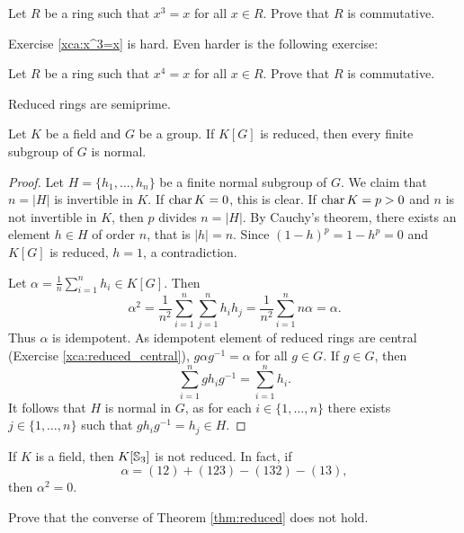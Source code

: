 \begin{exercise}
\label{xca:x^3=x}
    Let $R$ be a ring such that $x^3=x$ for all $x\in R$. Prove that
    $R$ is commutative. 
\end{exercise}

Exercise \ref{xca:x^3=x} is hard. 
Even harder is the following exercise:

\begin{exercise}
\label{xca:x^4=x}
    Let $R$ be a ring such that $x^4=x$ for all $x\in R$. Prove
    that $R$ is commutative. 
\end{exercise}



\begin{exercise}
\label{xca:reduced=>semiprime}
    Reduced rings are semiprime.
\end{exercise}
 
\begin{theorem}
\label{thm:reduced}
    Let $K$ be a field and $G$ be a group. If $K[G]$
    is reduced, then every finite subgroup of $G$ is normal. 
\end{theorem}

\begin{proof}
    Let $H=\{h_1,\dots,h_n\}$ be a finite normal subgroup of $G$. 
    We claim that $n=|H|$ is invertible in $K$. If $\operatorname{char} K=0$, this 
    is clear. If $\operatorname{char} K=p>0$ and $n$ is not invertible in $K$, 
    then $p$ divides $n=|H|$. By Cauchy's theorem, 
    there exists an element $h\in H$ of order $n$, that is 
    $|h|=n$. Since $(1-h)^p=1-h^p=0$ and $K[G]$ is reduced,
    $h=1$, a contradiction. 
    
    Let $\alpha=\frac{1}{n}\sum_{i=1}^nh_i\in K[G]$. Then
    \[
    \alpha^2=\frac{1}{n^2}\sum_{i=1}^n\sum_{j=1}^nh_ih_j
    =\frac{1}{n^2}\sum_{i=1}^nn\alpha=\alpha.
    \]
    Thus $\alpha$ is idempotent. As idempotent 
    element of reduced rings are central (Exercise \ref{xca:reduced_central}), 
    $g\alpha g^{-1}=\alpha$ for all $g\in G$. If $g\in G$, 
    then 
    \[
    \sum_{i=1}^n gh_ig^{-1}=\sum_{i=1}^n h_i.
    \]
    It follows that $H$ is normal in $G$, 
    as for each $i\in\{1,\dots,n\}$ 
    there exists $j\in\{1,\dots,n\}$ such that 
    $gh_ig^{-1}=h_j\in H$. 
\end{proof}

\begin{example}
    If $K$ is a field, then $K[\mathbb{S}_3]$ is not reduced. 
    In fact, 
    if 
    \[
    \alpha=(12)+(123)-(132)-(13),
    \]
    then 
    $\alpha^2=0$. 
\end{example}

\begin{exercise}
    Prove that the converse of Theorem \ref{thm:reduced} 
    does not hold. 
\end{exercise}

